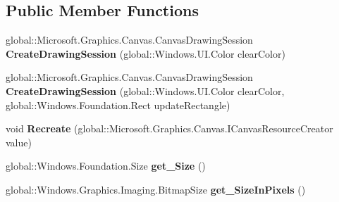 \subsection*{Public Member Functions}
\begin{DoxyCompactItemize}
\item 
\mbox{\label{interface_microsoft_1_1_graphics_1_1_canvas_1_1_u_i_1_1_xaml_1_1_i_canvas_image_source_a2712dc7b5d96ee15e13c5e52958f1cd4}} 
global\+::\+Microsoft.\+Graphics.\+Canvas.\+Canvas\+Drawing\+Session {\bfseries Create\+Drawing\+Session} (global\+::\+Windows.\+U\+I.\+Color clear\+Color)
\item 
\mbox{\label{interface_microsoft_1_1_graphics_1_1_canvas_1_1_u_i_1_1_xaml_1_1_i_canvas_image_source_abc05c809912de3ae92ccfebc505385d6}} 
global\+::\+Microsoft.\+Graphics.\+Canvas.\+Canvas\+Drawing\+Session {\bfseries Create\+Drawing\+Session} (global\+::\+Windows.\+U\+I.\+Color clear\+Color, global\+::\+Windows.\+Foundation.\+Rect update\+Rectangle)
\item 
\mbox{\label{interface_microsoft_1_1_graphics_1_1_canvas_1_1_u_i_1_1_xaml_1_1_i_canvas_image_source_a15fd97a0021f7ecd409f478ba91e851c}} 
void {\bfseries Recreate} (global\+::\+Microsoft.\+Graphics.\+Canvas.\+I\+Canvas\+Resource\+Creator value)
\item 
\mbox{\label{interface_microsoft_1_1_graphics_1_1_canvas_1_1_u_i_1_1_xaml_1_1_i_canvas_image_source_a7d8bd30d0a04d8736e7b731f51beda90}} 
global\+::\+Windows.\+Foundation.\+Size {\bfseries get\+\_\+\+Size} ()
\item 
\mbox{\label{interface_microsoft_1_1_graphics_1_1_canvas_1_1_u_i_1_1_xaml_1_1_i_canvas_image_source_a0ac817b62686169754a46a9175fd1f94}} 
global\+::\+Windows.\+Graphics.\+Imaging.\+Bitmap\+Size {\bfseries get\+\_\+\+Size\+In\+Pixels} ()
\item 
\mbox{\label{interface_microsoft_1_1_graphics_1_1_canvas_1_1_u_i_1_1_xaml_1_1_i_canvas_image_source_af71f6e17450c14d8d80205d22900491c}} 

\end{DoxyCompactItemize}
